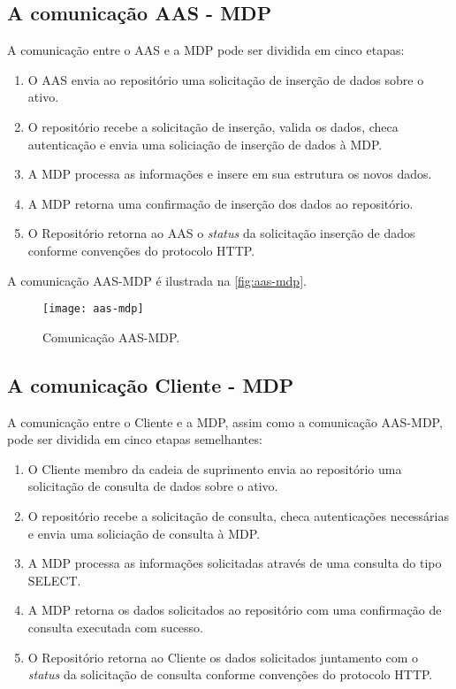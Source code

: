 \subsection{A comunicação AAS - MDP}
	
	A comunicação entre o AAS e a MDP pode ser dividida em cinco etapas:
	
	\begin{enumerate}
		\item O AAS envia ao repositório uma solicitação de inserção de dados sobre o ativo.
		\item O repositório recebe a solicitação de inserção, valida os dados, checa autenticação e envia uma soliciação de inserção de dados à MDP.
		\item A MDP processa as informações e insere em sua estrutura os novos dados.
		\item A MDP retorna uma confirmação de inserção dos dados ao repositório.
		\item O Repositório retorna ao AAS o \textit{status} da solicitação inserção de dados conforme convenções do protocolo HTTP.
	\end{enumerate}
	
	A comunicação AAS-MDP é ilustrada na \autoref{fig:aas-mdp}.
	
	\begin{figure}[htb]
		\centering
		\caption{Comunicação AAS-MDP.}
		\label{fig:aas-mdp}
		\texttt{[image: aas-mdp]}
	\end{figure}

\subsection{A comunicação Cliente - MDP}
	
	A comunicação entre o Cliente e a MDP, assim como a comunicação AAS-MDP, pode ser dividida em cinco etapas semelhantes:
	
	\begin{enumerate}
		\item O Cliente membro da cadeia de suprimento envia ao repositório uma solicitação de consulta de dados sobre o ativo.
		\item O repositório recebe a solicitação de consulta, checa autenticações necessárias e envia uma soliciação de consulta à MDP.
		\item A MDP processa as informações solicitadas através de uma consulta do tipo SELECT.
		\item A MDP retorna os dados solicitados ao repositório com uma confirmação de consulta executada com sucesso.
		\item O Repositório retorna ao Cliente os dados solicitados juntamento com o \textit{status} da solicitação de consulta conforme convenções do protocolo HTTP.
	\end{enumerate}
	
